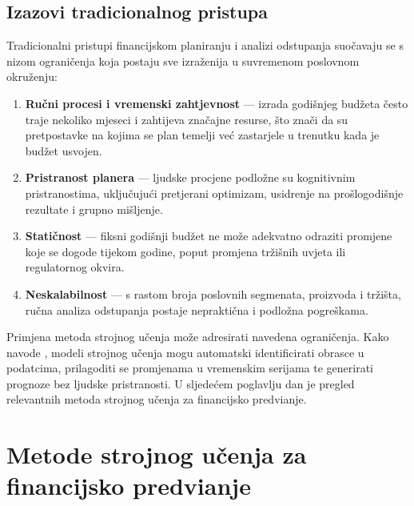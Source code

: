 \documentclass[zavrsnirad]{fer}
\begin{document}
\section{Izazovi tradicionalnog pristupa}
\label{sec:izazovi}

Tradicionalni pristupi financijskom planiranju i analizi odstupanja suo\v{c}avaju se s nizom ograni\v{c}enja koja postaju sve izraženija u suvremenom poslovnom okru\v{z}enju:

\begin{enumerate}
    \item \textbf{Ru\v{c}ni procesi i vremenski zahtjevnost} --- izrada godi\v{s}njeg bud\v{z}eta \v{c}esto traje nekoliko mjeseci i zahtijeva zna\v{c}ajne resurse, \v{s}to zna\v{c}i da su pretpostavke na kojima se plan temelji ve\'{c} zastarjele u trenutku kada je bud\v{z}et usvojen.
    \item \textbf{Pristranost planera} --- ljudske procjene podlo\v{z}ne su kognitivnim pristranostima, uklju\v{c}uju\'{c}i pretjerani optimizam, usidrenje na pro\v{s}logodi\v{s}nje rezultate i grupno mi\v{s}ljenje.
    \item \textbf{Stati\v{c}nost} --- fiksni godi\v{s}nji bud\v{z}et ne mo\v{z}e adekvatno odraziti promjene koje se dogode tijekom godine, poput promjena tr\v{z}i\v{s}nih uvjeta ili regulatornog okvira.
    \item \textbf{Neskalabilnost} --- s rastom broja poslovnih segmenata, proizvoda i tr\v{z}i\v{s}ta, ru\v{c}na analiza odstupanja postaje neprakti\v{c}na i podlo\v{z}na pogre\v{s}kama.
\end{enumerate}

Primjena metoda strojnog u\v{c}enja mo\v{z}e adresirati navedena ograni\v{c}enja. Kako navode \cite{makridakis2018statistical}, modeli strojnog u\v{c}enja mogu automatski identificirati obrasce u podatcima, prilagoditi se promjenama u vremenskim serijama te generirati prognoze bez ljudske pristranosti. U sljede\'{c}em poglavlju dan je pregled relevantnih metoda strojnog u\v{c}enja za financijsko predvi\dj anje.


\chapter{Metode strojnog u\v{c}enja za financijsko predvi\dj anje}
\label{pog:metode_ml}
\end{document}
